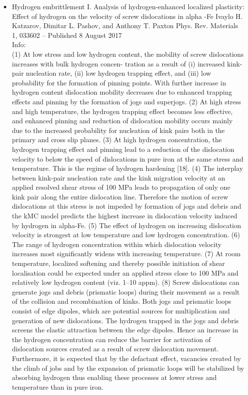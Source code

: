 \documentclass[11pt,floatfix,showpacs]{amsart}
\begin{document}
\begin{itemize}
\item Hydrogen embrittlement I. Analysis of hydrogen-enhanced localized plasticity: Effect of hydrogen on the velocity of screw dislocations in alpha -Fe Ivaylo H. Katzarov, Dimitar L. Pashov, and Anthony T. Paxton
Phys. Rev. Materials 1, 033602 – Published 8 August 2017\\
Info:\\
(1) At low stress and low hydrogen content, the mobility of screw dislocations increases with bulk hydrogen concen- tration as a result of (i) increased kink-pair nucleation rate, (ii) low hydrogen trapping effect, and (iii) low probability for the formation of pinning points. With further increase in hydrogen content dislocation mobility decreases due to enhanced trapping effects and pinning by the formation of jogs and superjogs.
(2) At high stress and high temperature, the hydrogen trapping effect becomes less effective, and enhanced pinning and reduction of dislocation mobility occurs mainly due to the increased probability for nucleation of kink pairs both in the primary and cross slip planes.
(3) At high hydrogen concentration, the hydrogen trapping effect and pinning lead to a reduction of the dislocation velocity to below the speed of dislocations in pure iron at the same stress and temperature. This is the regime of hydrogen hardening [18].
(4) The interplay between kink-pair nucleation rate and the kink migration velocity at an applied resolved shear stress of 100 MPa leads to propagation of only one kink pair along the entire dislocation line. Therefore the motion of screw dislocations at this stress is not impeded by formation of jogs and debris and the kMC model predicts the highest increase in dislocation velocity induced by hydrogen in alpha-Fe.
(5) The effect of hydrogen on increasing dislocation velocity is strongest at low temperature and low hydrogen concentration.
(6) The range of hydrogen concentration within which dislocation velocity increases most significantly widens with increasing temperature.
(7) At room temperature, localized softening and thereby possible initiation of shear localisation could be expected under an applied stress close to 100 MPa and relatively low hydrogen content (viz. 1–10 appm).
(8) Screw dislocations can generate jogs and debris (prismatic loops) during their movement as a result of the collision and recombination of kinks. Both jogs and prismatic loops consist of edge dipoles, which are potential sources for multiplication and generation of new dislocations. The hydrogen trapped in the jogs and debris screens the elastic attraction between the edge dipoles. Hence an increase in the hydrogen concentration can reduce the barrier for activation of dislocation sources created as a result of screw dislocation movement. Furthermore, it is expected that by the defactant effect, vacancies created by the climb of jobs and by the expansion of prismatic loops will be stabilized by absorbing hydrogen thus enabling these processes at lower stress and temperature than in pure iron. 


\end{itemize}
\end{document}
